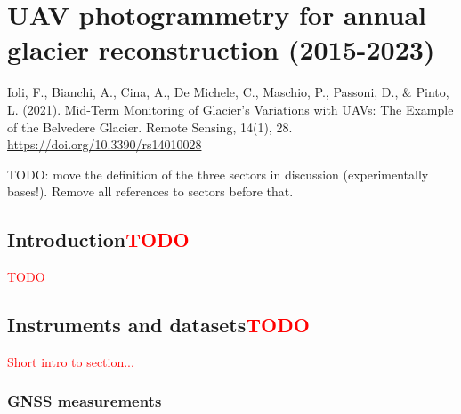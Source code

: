 \graphicspath{{figures/chapter3/}}
\onehalfspacing

\chapter{UAV photogrammetry for annual glacier reconstruction (2015-2023)}\label{ch:3}

\vfill


\noindent Ioli, F., Bianchi, A., Cina, A., De Michele, C., Maschio, P., Passoni, D., \&
Pinto, L. (2021). Mid-Term Monitoring of Glacier’s Variations with UAVs: The Example of
the Belvedere Glacier. Remote Sensing, 14(1), 28.
\url{https://doi.org/10.3390/rs14010028}

\newpage

{\color{red} TODO: move the definition of the three sectors in discussion (experimentally bases!). Remove all references to sectors before that.}


\section{Introduction\textcolor{red}{TODO}}\label{sec:3:intro}

\textcolor{red}{TODO}


\section{Instruments and datasets\textcolor{red}{TODO}}\label{sec:3:instrument}

\textcolor{red}{Short intro to section...}

 
\subsection{GNSS measurements}\label{sec:3:gnss}

